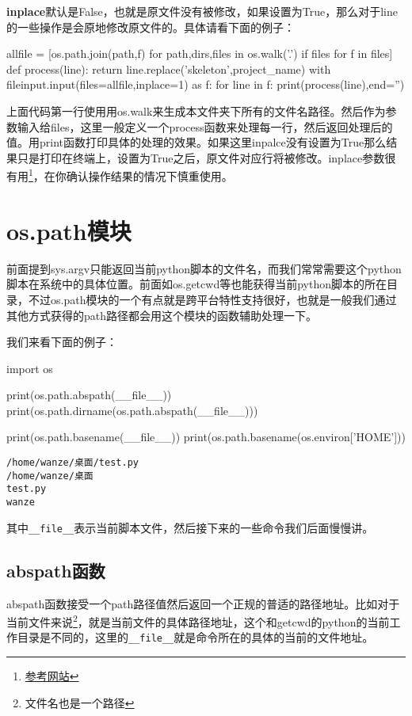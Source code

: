 \documentclass[12pt,oneside]{book}
\begin{document}
\begin{common-format}
\textbf{inplace}默认是False，也就是原文件没有被修改，如果设置为True，那么对于line的一些操作是会原地修改原文件的。具体请看下面的例子：
\begin{tcbpython}[]
allfile = [os.path.join(path,f) for path,dirs,files in os.walk('.')
        if files for f in files]
def process(line):
    return line.replace('skeleton',project_name)
with fileinput.input(files=allfile,inplace=1) as f:
    for line in f:
        print(process(line),end='')
\end{tcbpython}
上面代码第一行使用用os.walk来生成本文件夹下所有的文件名路径。然后作为参数输入给files，这里一般定义一个process函数来处理每一行，然后返回处理后的值。用print函数打印具体的处理的效果。如果这里inpalce没有设置为True那么结果只是打印在终端上，设置为True之后，原文件对应行将被修改。inplace参数很有用\footnote{\href{http://ruslanspivak.com/2010/10/20/in-place-file-rewrite-with-fileinput/}{参考网站}}，在你确认操作结果的情况下慎重使用。


\chapter{os.path模块}
前面提到sys.argv只能返回当前python脚本的文件名，而我们常常需要这个python脚本在系统中的具体位置。前面如os.getcwd等也能获得当前python脚本的所在目录，不过os.path模块的一个有点就是跨平台特性支持很好，也就是一般我们通过其他方式获得的path路径都会用这个模块的函数辅助处理一下。

我们来看下面的例子：
\begin{tcbpython}[]
import os

print(os.path.abspath(__file__))
print(os.path.dirname(os.path.abspath(__file__)))

print(os.path.basename(__file__))
print(os.path.basename(os.environ['HOME']))

\end{tcbpython}
\begin{Verbatim}
/home/wanze/桌面/test.py
/home/wanze/桌面
test.py
wanze
\end{Verbatim}

其中\verb+__file__+表示当前脚本文件，然后接下来的一些命令我们后面慢慢讲。

\section{abspath函数}
abspath函数接受一个path路径值然后返回一个正规的普适的路径地址。比如对于当前文件来说\footnote{文件名也是一个路径}，就是当前文件的具体路径地址，这个和getcwd的python的当前工作目录是不同的，这里的\verb+__file__+就是命令所在的具体的当前的文件地址。


\end{common-format}
\end{document}
